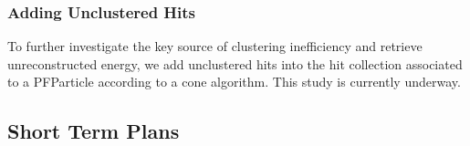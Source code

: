 \subsubsection{Adding Unclustered Hits}
\label{sec:adding_hits}

To further investigate the key source of clustering inefficiency
and retrieve unreconstructed energy,
we add unclustered hits into the hit collection associated to a 
PFParticle according to a cone algorithm.
This study is currently underway.

\subsection{Short Term Plans}
\label{sec:plans}

